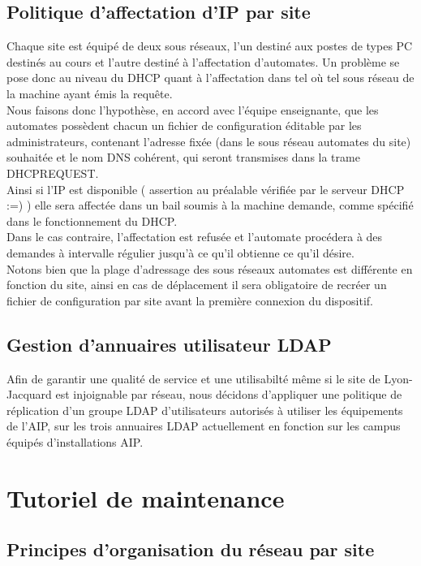 \documentclass[a4paper]{article}
\begin{document}
\subsection{Politique d'affectation d'IP par site}

Chaque site est équipé de deux sous réseaux, l'un destiné aux postes de types PC destinés au cours et l'autre destiné à l'affectation d'automates. Un problème se pose donc au niveau du DHCP quant à l'affectation dans tel où tel sous réseau de la machine ayant émis la requête.\\
Nous faisons donc l'hypothèse, en accord avec l'équipe enseignante, que les automates possèdent chacun un fichier de configuration éditable par les administrateurs, contenant l'adresse fixée (dans le sous réseau automates du site) souhaitée et le nom DNS cohérent, qui seront transmises dans la trame DHCPREQUEST.\\
Ainsi si l'IP est disponible ( assertion au préalable vérifiée par le serveur DHCP :=) ) elle sera affectée dans un bail soumis à la machine demande, comme spécifié dans le fonctionnement du DHCP.\\
Dans le cas contraire, l'affectation est refusée et l'automate procédera à des demandes à intervalle régulier jusqu'à ce qu'il obtienne ce qu'il désire.\\
Notons bien que la plage d'adressage des sous réseaux automates est différente en fonction du site, ainsi en cas de déplacement il sera obligatoire de recréer un fichier de configuration par site avant la première connexion du dispositif. 

\subsection{Gestion d'annuaires utilisateur LDAP}

Afin de garantir une qualité de service et une utilisabilté même si le site de Lyon-Jacquard est injoignable par réseau, nous décidons d'appliquer une politique de réplication d'un groupe LDAP d'utilisateurs autorisés à utiliser les équipements de l'AIP, sur les trois annuaires LDAP actuellement en fonction sur les campus équipés d'installations AIP.

\section{Tutoriel de maintenance}

\subsection{Principes d'organisation du réseau par site}
\end{document}
